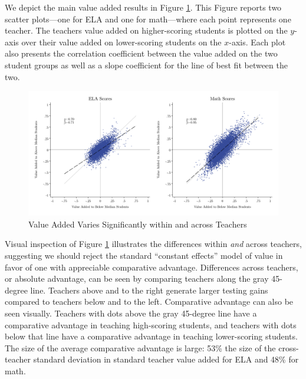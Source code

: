 \documentclass[12pt]{article}
\theoremstyle{definition}
\theoremstyle{definition}
\theoremstyle{definition}
\theoremstyle{definition}
\begin{document}
We depict the main value added results in Figure \ref{fig:va_est}. This Figure reports two scatter plots---one for ELA and one for math---where each point represents one teacher. The teachers value added on higher-scoring students is plotted on the $y$-axis over their value added on lower-scoring students on the $x$-axis. Each plot also presents the correlation coefficient between the value added on the two student groups as well as a slope coefficient for the line of best fit between the two. %



\begin{figure}[htpb]
\centering
\includegraphics[width=.9\textwidth]{Working_Paper/test_figures/02a_VA.pdf}
    \caption{Value Added Varies Significantly within and across Teachers}
    \label{fig:va_est}
\end{figure}

Visual inspection of Figure \ref{fig:va_est} illustrates the differences within \textit{and} across teachers, suggesting we should reject the standard ``constant effects'' model of value in favor of one with appreciable comparative advantage. Differences across teachers, or absolute advantage, can be seen by comparing teachers along the gray 45-degree line. Teachers above and to the right generate larger testing gains compared to teachers below and to the left. Comparative advantage can also be seen visually. Teachers with dots above the gray 45-degree line have a comparative advantage in teaching high-scoring students, and teachers with dots below that line have a comparative advantage in teaching lower-scoring students. The size of the average comparative advantage is large: 53\% the size of the cross-teacher standard deviation in standard teacher value added for ELA and 48\% for math.  %
\end{document}

